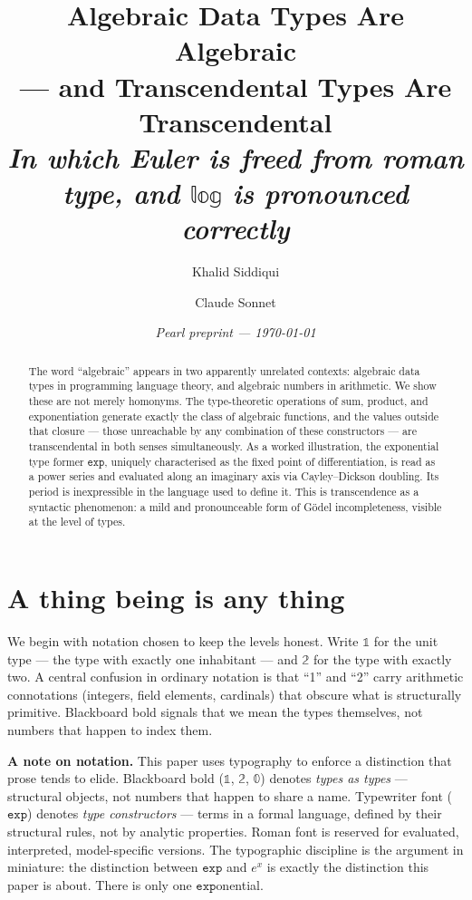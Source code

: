 \documentclass[11pt, a4paper]{article}
\theoremstyle{pearlstyle}
\newcommand{\bone}{\mathbb{1}}
\newcommand{\btwo}{\mathbb{2}}
\newcommand{\bzero}{\mathbb{0}}
\newcommand{\Exp}{\mathtt{exp}}
\begin{document}
\title{Algebraic Data Types Are Algebraic\\[4pt]
  {\large --- and Transcendental Types Are Transcendental}\\[6pt]
  {\normalsize\itshape In which Euler is freed from roman type,
  and $\mathbb{log}$ is pronounced correctly}}
\author{Khalid Siddiqui \and Claude Sonnet}
\date{\itshape Pearl preprint --- \today}
\maketitle

\begin{abstract}
The word ``algebraic'' appears in two apparently unrelated contexts:
algebraic data types in programming language theory, and algebraic numbers in
arithmetic. We show these are not merely homonyms. The type-theoretic operations
of sum, product, and exponentiation generate exactly the class of algebraic
functions, and the values outside that closure --- those unreachable by any
combination of these constructors --- are transcendental in both senses
simultaneously. As a worked illustration, the exponential type former
$\mathtt{exp}$, uniquely characterised as the fixed point of differentiation,
is read as a power series and evaluated along an imaginary axis via
Cayley--Dickson doubling. Its period is inexpressible in the language used to
define it. This is transcendence as a syntactic phenomenon: a mild and
pronounceable form of G\"{o}del incompleteness, visible at the level of types.
\end{abstract}

\section{A thing being is any thing}

We begin with notation chosen to keep the levels honest. Write $\bone$ for the
unit type --- the type with exactly one inhabitant --- and $\btwo$ for the type
with exactly two. A central confusion in ordinary notation is that ``1'' and
``2'' carry arithmetic connotations (integers, field elements, cardinals) that
obscure what is structurally primitive. Blackboard bold signals that we mean the
types themselves, not numbers that happen to index them.

\medskip
\noindent\textbf{A note on notation.} This paper uses typography to enforce a
distinction that prose tends to elide. Blackboard bold ($\bone$, $\btwo$,
$\bzero$) denotes \emph{types as types} --- structural objects, not numbers that
happen to share a name. Typewriter font ($\Exp$) denotes \emph{type
constructors} --- terms in a formal language, defined by their structural rules,
not by analytic properties. Roman font is reserved for evaluated,
interpreted, model-specific versions. The typographic discipline is the argument
in miniature: the distinction between $\Exp$ and $e^x$ is exactly the
distinction this paper is about. There is only one $\mathtt{exp}$onential.
\end{document}
